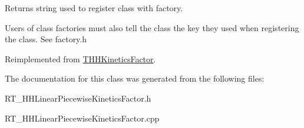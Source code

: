Returns string used to register class with factory. 

Users of class factories must also tell the class the key they used when registering the class. See factory.\+h 

Reimplemented from \hyperlink{class_t_h_h_kinetics_factor_ac161d432e14597146b0bd45cbed7e225}{T\+H\+H\+Kinetics\+Factor}.



The documentation for this class was generated from the following files\+:\begin{DoxyCompactItemize}
\item 
R\+T\+\_\+\+H\+H\+Linear\+Piecewise\+Kinetics\+Factor.\+h\item 
R\+T\+\_\+\+H\+H\+Linear\+Piecewise\+Kinetics\+Factor.\+cpp\end{DoxyCompactItemize}
